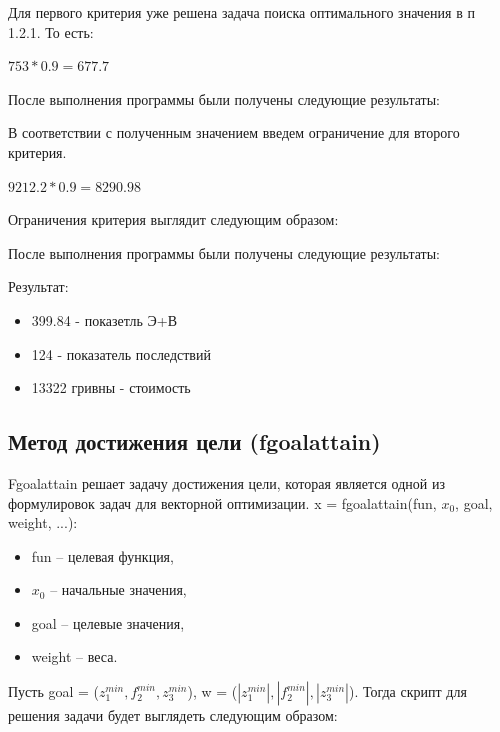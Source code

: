 \documentclass[14pt,a4paper,report]{report}
\begin{document}
Для первого критерия уже решена задача поиска оптимального значения в п 1.2.1. То есть:
\begin{center}
$753 * 0.9 = 677.7$
\end{center}



После выполнения программы были получены следующие результаты:


В соответствии с полученным значением введем ограничение для второго критерия.

\begin{center}
$ 9212.2 * 0.9 = 8290.98 $
\end{center}

Ограничения критерия выглядит следующим образом:



После выполнения программы были получены следующие результаты:



Результат:
\begin{itemize}
\item 399.84 - показетль Э+В
\item 124 - показатель последствий
\item 13322 гривны - стоимость
\end{itemize}






























\subsection{Метод достижения цели (fgoalattain)}
Fgoalattain решает задачу достижения цели, которая является одной из формулировок задач для векторной оптимизации.
x = fgoalattain(fun, $x_0$, goal, weight, ...):
\begin{itemize}
\item fun – целевая функция,
\item $x_0$ – начальные значения,
\item goal – целевые значения,
\item weight – веса.
\end{itemize}
Пусть goal = ($z_1^{min}, f_2^{min}, z_3^{min}$), w = ($|z_1^{min}|, |f_2^{min}|, |z_3^{min}|$). Тогда скрипт для решения задачи будет выглядеть следующим образом:
\end{document}
